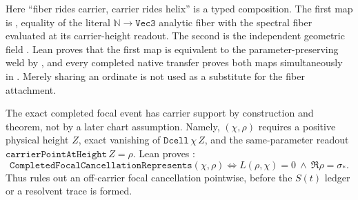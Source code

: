 Here ``fiber rides carrier, carrier rides helix'' is a typed composition.
The first map is
, equality of the literal
\(\mathbb N\to\texttt{Vec3}\) analytic fiber with the spectral fiber evaluated
at its carrier-height readout.  The second is the independent geometric field
.  Lean proves that the first map is
equivalent to the parameter-preserving weld by
, and every completed native transfer proves
both maps simultaneously in
.  Merely sharing an ordinate is not
used as a substitute for the fiber attachment.

The exact completed focal event has carrier support by construction and
theorem, not by a later chart assumption.  Namely,
$(\chi,\rho)$ requires a positive
physical height \(Z\), exact vanishing of \(\texttt{Dcell}\,\chi\,Z\), and the
same-parameter readout \(\texttt{carrierPointAtHeight}\,Z=\rho\).  Lean proves
:
\[
 \texttt{CompletedFocalCancellationRepresents}(\chi,\rho)
 \Longleftrightarrow L(\rho,\chi)=0\ \wedge\ \Re\rho=\sigma_*.
\]
Thus  rules out an
off-carrier focal cancellation pointwise, before the \(S(t)\) ledger or a
resolvent trace is formed.

